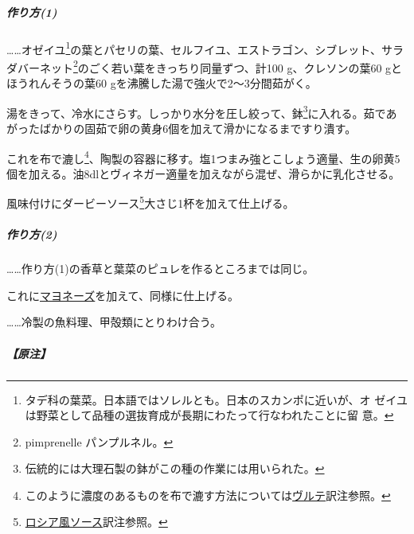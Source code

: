 \begin{recette}


\hypertarget{sauce-vincent-1}{%
\subparagraph{作り方(1)}\label{sauce-vincent-1}}

\ldots{}\ldots{}オゼイユ\footnote{タデ科の葉菜。日本語ではソレルとも。日本のスカンポに近いが、オ
  ゼイユは野菜として品種の選抜育成が長期にわたって行なわれたことに留
  意。}の葉とパセリの葉、セルフイユ、エストラゴン、シブレット、サラダバーネット\footnote{pimprenelle
  パンプルネル。}のごく若い葉をきっちり同量ずつ、計100 g、クレソンの葉60
gとほうれんそうの葉60 gを沸騰した湯で強火で2〜3分間茹がく。

湯をきって、冷水にさらす。しっかり水分を圧し絞って、鉢\footnote{伝統的には大理石製の鉢がこの種の作業には用いられた。}に入れる。茹であがったばかりの固茹で卵の黄身6個を加えて滑かになるまですり潰す。

これを布で漉し\footnote{このように濃度のあるものを布で漉す方法については\protect\hyperlink{veloute}{ヴルテ}訳注参照。}、陶製の容器に移す。塩1つまみ強とこしょう適量、生の卵黄5個を加える。油8dlとヴィネガー適量を加えながら混ぜ、滑らかに乳化させる。

風味付けにダービーソース\footnote{\protect\hyperlink{sauce-russe-froide}{ロシア風ソース}訳注参照。}大さじ1杯を加えて仕上げる。

\hypertarget{sauce-vincent-2}{%
\subparagraph{作り方(2)}\label{sauce-vincent-2}}

\ldots{}\ldots{}作り方(1)の香草と葉菜のピュレを作るところまでは同じ。

これに\protect\hyperlink{mayonnaise}{マヨネーズ}を加えて、同様に仕上げる。

\ldots{}\ldots{}冷製の魚料理、甲殻類にとりわけ合う。

\hypertarget{nota-sauce-vincent}{%
\subparagraph{【原注】}\label{nota-sauce-vincent}}


\end{recette}
